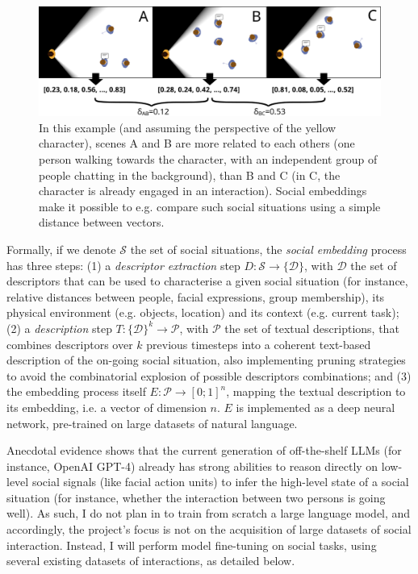 \begin{figure}[H]
    \centering
    \includegraphics[width=0.9\linewidth]{figs/social-embeddings}
    \caption{In this example (and assuming the perspective of the yellow
    character), scenes A and B  are more related to each others (one person
    walking towards the character, with an independent group of people chatting
    in the background), than B and C (in C, the character is already engaged in
    an interaction).  Social embeddings make it possible to e.g. compare such
    social situations using a simple distance between vectors.}

    \label{fig:social-embeddings}
\end{figure}


Formally, if we denote $\mathcal{S}$ the set of social situations, the
\emph{social embedding} process has three steps: (1) a \emph{descriptor
extraction} step $D : \mathcal{S} \to \{\mathcal{D}\}$, with $\mathcal{D}$ the
set of descriptors that can be used to characterise a given social situation
(for instance, relative distances between people, facial expressions, group
membership), its physical environment (e.g. objects, location) and its context
(e.g. current task); (2) a \emph{description} step $T: \{\mathcal{D}\}^k \to
\mathcal{P}$, with $\mathcal{P}$ the set of textual descriptions, that combines
descriptors over $k$ previous timesteps into a coherent text-based description
of the on-going social situation, also implementing pruning strategies to avoid
the combinatorial explosion of possible descriptors combinations; and (3) the
embedding process itself $E : \mathcal{P} \to [0;1]^n$, mapping the textual
description to its embedding, i.e.  a vector of dimension $n$. $E$ is
implemented as a deep neural network, pre-trained on large datasets of natural
language.

Anecdotal evidence shows that the current generation of off-the-shelf LLMs (for
instance, OpenAI GPT-4) already has strong abilities to reason directly on
low-level social signals (like facial action units) to infer the high-level
state of a social situation (for instance, whether the interaction between two
persons is going well). As such, I do not plan in \project to train from scratch
a large language model, and accordingly, the project's focus is not on the
acquisition of large datasets of social interaction. Instead, I will perform
model fine-tuning on social tasks, using several existing datasets of
interactions, as detailed below.


